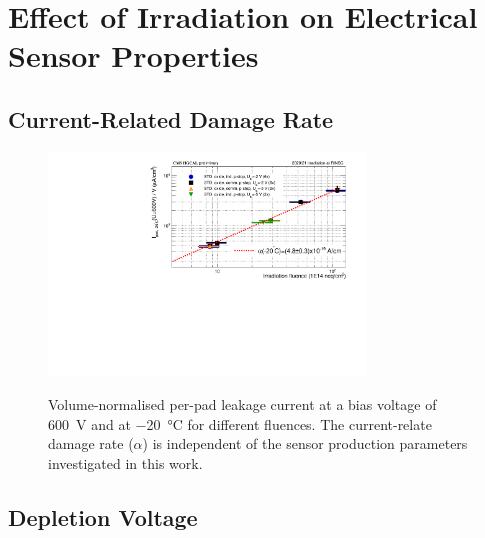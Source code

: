 \section{Effect of Irradiation on Electrical Sensor Properties}
\label{sec:irradiation}

\subsection{Current-Related Damage Rate}
\label{subsec:irradiation_alpha}

\begin{figure}[h]
	\centering
	\includegraphics[width=0.75\textwidth]{plots/alpha/alpha_600V.pdf}
	\label{plot:alpha}
	\caption{
	    Volume-normalised per-pad leakage current at a bias voltage of \SI{600}{\volt} and at \SI{-20}{\celsius} for different fluences.
        The current-relate damage rate ($\alpha$) is independent of the sensor production parameters investigated in this work.
	}
\end{figure}

\subsection{Depletion Voltage}
\label{subsec:irradiation_Vdep}
